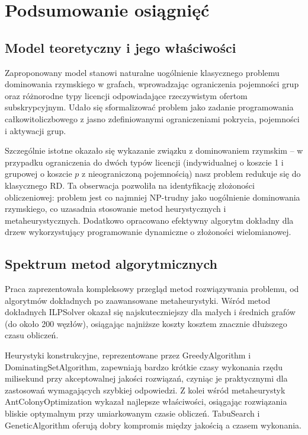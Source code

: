 \section{Podsumowanie osiągnięć}

\subsection{Model teoretyczny i jego właściwości}

Zaproponowany model stanowi naturalne uogólnienie klasycznego problemu dominowania rzymskiego w grafach, wprowadzając ograniczenia pojemności grup oraz różnorodne typy licencji odpowiadające rzeczywistym ofertom subskrypcyjnym. Udało się sformalizować problem jako zadanie programowania całkowitoliczbowego z jasno zdefiniowanymi ograniczeniami pokrycia, pojemności i aktywacji grup.

Szczególnie istotne okazało się wykazanie związku z dominowaniem rzymskim -- w przypadku ograniczenia do dwóch typów licencji (indywidualnej o koszcie 1 i grupowej o koszcie $p$ z nieograniczoną pojemnością) nasz problem redukuje się do klasycznego RD. Ta obserwacja pozwoliła na identyfikację złożoności obliczeniowej: problem jest co najmniej NP-trudny jako uogólnienie dominowania rzymskiego, co uzasadnia stosowanie metod heurystycznych i metaheurystycznych. Dodatkowo opracowano efektywny algorytm dokładny dla drzew wykorzystujący programowanie dynamiczne o złożoności wielomianowej.

\subsection{Spektrum metod algorytmicznych}

Praca zaprezentowała kompleksowy przegląd metod rozwiązywania problemu, od algorytmów dokładnych po zaawansowane metaheurystyki. Wśród metod dokładnych ILPSolver okazał się najskuteczniejszy dla małych i średnich grafów (do około 200 węzłów), osiągając najniższe koszty kosztem znacznie dłuższego czasu obliczeń.

Heurystyki konstrukcyjne, reprezentowane przez GreedyAlgorithm i DominatingSetAlgorithm, zapewniają bardzo krótkie czasy wykonania rzędu milisekund przy akceptowalnej jakości rozwiązań, czyniąc je praktycznymi dla zastosowań wymagających szybkiej odpowiedzi. Z kolei wśród metaheurystyk AntColonyOptimization wykazał najlepsze właściwości, osiągając rozwiązania bliskie optymalnym przy umiarkowanym czasie obliczeń. TabuSearch i GeneticAlgorithm oferują dobry kompromis między jakością a czasem wykonania.

